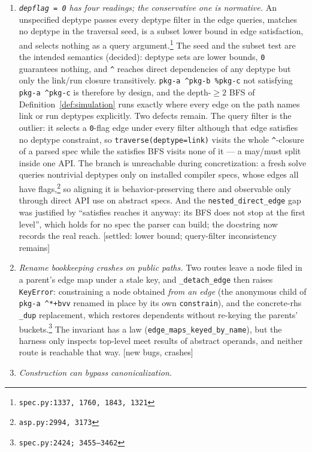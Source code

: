 \documentclass[11pt]{article}
\theoremstyle{definition}
\theoremstyle{remark}
\newcommand{\code}[1]{\texttt{#1}}
\newcommand{\src}[1]{\footnote{\code{#1}}}
\begin{document}
\begin{enumerate}[itemsep=3pt]
object, so mutating a copy flips the \emph{original's} \code{satisfies}
verdict.  [new bugs: congruence of all three equalities, aliasing]
\item \emph{\code{depflag = 0} has four readings; the conservative one is
normative.}  An unspecified deptype passes every deptype filter in the edge
queries, matches no deptype in the traversal seed,
is a subset lower bound in edge satisfaction, and selects nothing as a query
argument.\src{spec.py:1337, 1760, 1843, 1321}  The seed and the subset test
are the intended semantics (decided): deptype sets are lower bounds,
\code{0} guarantees nothing, and \code{\^{}} reaches direct dependencies of
any deptype but only the link/run closure transitively.
\code{pkg-a \^{}pkg-b \%pkg-c} not satisfying \code{pkg-a \^{}pkg-c} is
therefore by design, and the depth-$\geq 2$ BFS of
Definition~\ref{def:simulation} runs exactly where every edge on the path
names link or run deptypes explicitly.  Two defects remain.  The query
filter is the outlier: it selects a \code{0}-flag edge under every filter
although that edge satisfies no deptype constraint, so
\code{traverse(deptype=link)} visits the whole \code{\^{}}-closure of a
parsed spec while the satisfies BFS visits none of it --- a may/must split
inside one API.  The branch is unreachable during concretization: a fresh
solve queries nontrivial deptypes only on installed compiler specs, whose
edges all have flags,\src{asp.py:2994, 3173} so aligning it is
behavior-preserving there and observable only through direct API use on
abstract specs.  And the \code{nested\_direct\_edge} gap was justified by
``satisfies reaches it anyway: its BFS does not stop at the first level'',
which holds for no spec the parser can build; the docstring now records the
real reach.  [settled: lower bound; query-filter inconsistency remains]
\item \emph{Rename bookkeeping crashes on public paths.}  Two routes leave a
node filed in a parent's edge map under a stale key, and
\code{\_detach\_edge} then raises \code{KeyError}: constraining a node
obtained \emph{from an edge} (the anonymous child of
\code{pkg-a \^{}*+bvv} renamed in place by its own \code{constrain}), and
the concrete-rhs \code{\_dup} replacement, which restores dependents without
re-keying the parents' buckets.\src{spec.py:2424; 3455--3462}  The invariant
has a law (\code{edge\_maps\_keyed\_by\_name}), but the harness only
inspects top-level meet results of abstract operands, and neither route is
reachable that way.  [new bugs, crashes]
\item \emph{Construction can bypass canonicalization.}

\end{enumerate}
\end{document}
